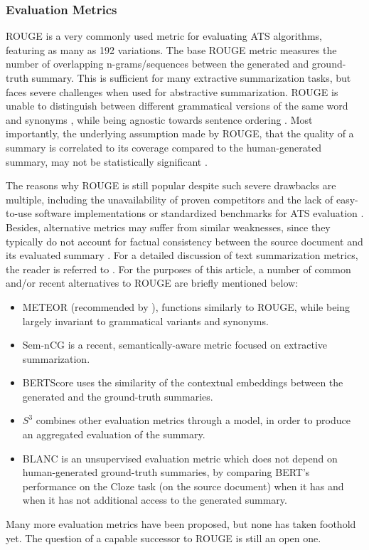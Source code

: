 \documentclass[preprint,review,10pt]{elsarticle}
\begin{document}
	\subsubsection{Evaluation Metrics}
	\label{sss::SummarizationEvaluation}
	ROUGE is a very commonly used metric for evaluating ATS algorithms, featuring as many as 192 variations. The base ROUGE metric \cite{rouge} measures the number of overlapping n-grams/sequences between the generated and ground-truth summary. This is sufficient for many extractive summarization tasks, but faces severe challenges when used for abstractive summarization. ROUGE is unable to distinguish between different grammatical versions of the same word \cite{suleiman} and synonyms \cite{akter}, while being agnostic towards sentence ordering \cite{graham}. Most importantly, the underlying assumption made by ROUGE, that the quality of a summary is correlated to its coverage compared to the human-generated summary, may not be statistically significant \cite{pitler}.
	
	The reasons why ROUGE is still popular despite such severe drawbacks are multiple, including the unavailability of proven competitors and the lack of easy-to-use software implementations or standardized benchmarks for ATS evaluation \cite{fabbri}. Besides, alternative metrics may suffer from similar weaknesses, since they typically do not account for factual consistency between the source document and its evaluated summary \cite{kryscinski}. For a detailed discussion of text summarization metrics, the reader is referred to \cite{fabbri}. For the purposes of this article, a number of common and/or recent alternatives to ROUGE are briefly mentioned below:
	
	\begin{itemize}
		\item METEOR \cite{meteor} (recommended by \cite{suleiman}), functions similarly to ROUGE, while being largely invariant to grammatical variants and synonyms.
		\item Sem-nCG \cite{akter} is a recent, semantically-aware metric focused on extractive summarization.
		\item BERTScore \cite{bert_score} uses the similarity of the contextual embeddings between the generated and the ground-truth summaries.
		\item $S^{3}$ \cite{s3} combines other evaluation metrics through a model, in order to produce an aggregated evaluation of the summary.
		\item BLANC \cite{blanc} is an unsupervised evaluation metric which does not depend on human-generated ground-truth summaries, by comparing BERT's performance on the Cloze task (on the source document) when it has and when it has not additional access to the generated summary.
	\end{itemize}
	Many more evaluation metrics have been proposed, but none has taken foothold yet. The question of a capable successor to ROUGE is still an open one.
	
\end{document}
